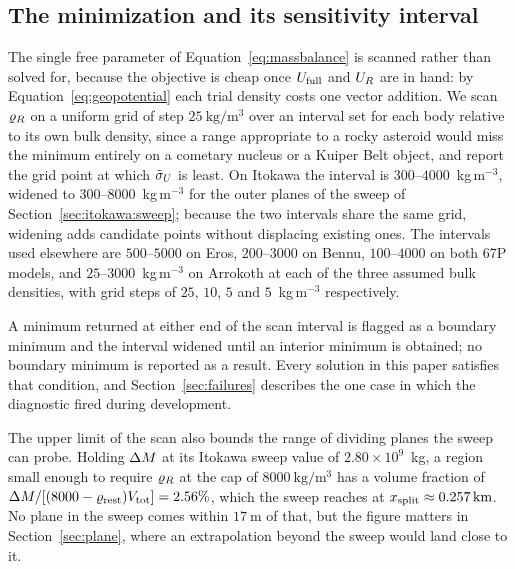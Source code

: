 \subsection{The minimization and its sensitivity interval}
\label{sec:methods:minimisation}

The single free parameter of Equation~\eqref{eq:massbalance} is scanned
rather than solved for, because the objective is cheap once $U_{\mathrm{full}}$ and
$U_{R}$ are in hand: by Equation~\eqref{eq:geopotential} each trial density
costs one vector addition. We scan $\varrho_{R}$ on a uniform grid of step
$\SI{25}{\kilo\gram\per\cubic\metre}$ over an interval set for each body
relative to its own bulk density, since a range appropriate to a rocky
asteroid would miss the minimum entirely on a cometary nucleus or a
Kuiper Belt object, and report the grid point at which $\tilde{\sigma}_{U}$ is
least. On Itokawa the interval is $300$--$4000$~kg\,m$^{-3}$, widened to
$300$--$8000$~kg\,m$^{-3}$ for the outer planes of the sweep of
Section~\ref{sec:itokawa:sweep}; because the two intervals share the same
grid, widening adds candidate points without displacing existing ones.
The intervals used elsewhere are
$500$--$5000$ on Eros, $200$--$3000$ on Bennu, $100$--$4000$ on both 67P
models, and $25$--$3000$~kg\,m$^{-3}$ on Arrokoth at each of the three assumed
bulk densities, with grid steps of $25$, $10$, $5$ and $5$~kg\,m$^{-3}$
respectively.

A minimum returned at either end of the scan interval is flagged as a
boundary minimum and the interval widened until an interior minimum is
obtained; no boundary minimum is reported as a result. Every solution in
this paper satisfies that condition, and Section~\ref{sec:failures}
describes the one case in which the diagnostic fired during development.

The upper limit of the scan also bounds the range of dividing planes the
sweep can probe. Holding $\Delta M$ at its Itokawa sweep value of
$2.80\times10^{9}$~kg, a region small enough to require $\varrho_{R}$ at the cap
of $\SI{8000}{\kilo\gram\per\cubic\metre}$ has a volume fraction of
$\Delta M/[(8000-\varrho_{\mathrm{rest}})V_{\mathrm{tot}}] = 2.56\%$, which the sweep reaches at
$x_{\mathrm{split}} \approx \SI{0.257}{\kilo\metre}$. No plane in the sweep comes
within $\SI{17}{\metre}$ of that, but the figure matters in
Section~\ref{sec:plane}, where an extrapolation beyond the sweep would land
close to it.

